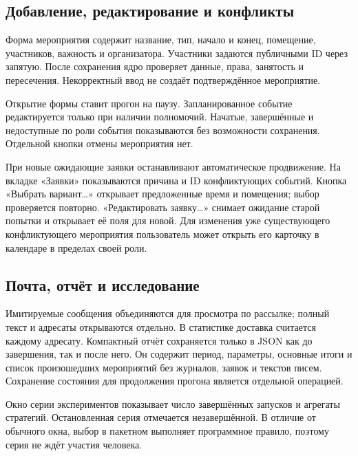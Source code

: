 \subsection{Добавление, редактирование и конфликты}
Форма мероприятия содержит название, тип, начало и конец, помещение, участников, важность и организатора. Участники задаются публичными ID через запятую. После сохранения ядро проверяет данные, права, занятость и пересечения. Некорректный ввод не создаёт подтверждённое мероприятие.

Открытие формы ставит прогон на паузу. Запланированное событие редактируется только при наличии полномочий. Начатые, завершённые и недоступные по роли события показываются без возможности сохранения. Отдельной кнопки отмены мероприятия нет.

При  новые ожидающие заявки останавливают автоматическое продвижение. На вкладке «Заявки» показываются причина и ID конфликтующих событий. Кнопка «Выбрать вариант…» открывает предложенные время и помещения; выбор проверяется повторно. «Редактировать заявку…» снимает ожидание старой попытки и открывает её поля для новой. Для изменения уже существующего конфликтующего мероприятия пользователь может открыть его карточку в календаре в пределах своей роли.

\subsection{Почта, отчёт и исследование}
Имитируемые сообщения объединяются для просмотра по рассылке; полный текст и адресаты открываются отдельно. В статистике доставка считается каждому адресату. Компактный отчёт сохраняется только в JSON как до завершения, так и после него. Он содержит период, параметры, основные итоги и список произошедших мероприятий без журналов, заявок и текстов писем. Сохранение состояния для продолжения прогона является отдельной операцией.

Окно серии экспериментов показывает число завершённых запусков и агрегаты стратегий. Остановленная серия отмечается незавершённой. В отличие от обычного окна, выбор в пакетном  выполняет программное правило, поэтому серия не ждёт участия человека.
